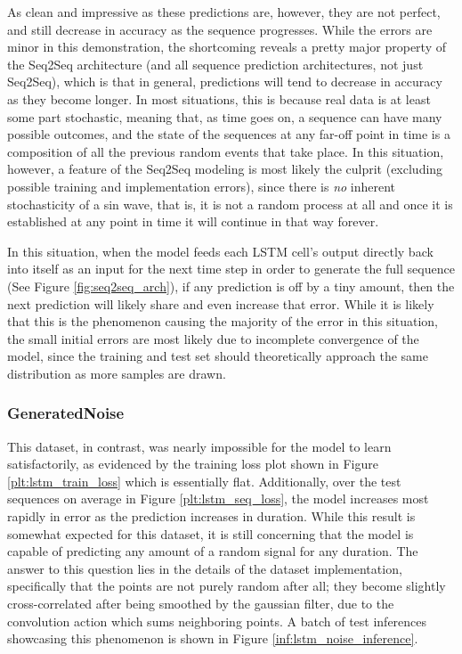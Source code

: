 \documentclass{scrartcl}
\begin{document}
As clean and impressive as these predictions are, however, they are not
perfect, and still decrease in accuracy as the sequence progresses. While the
errors are minor in this demonstration, the shortcoming reveals a pretty major
property of the Seq2Seq architecture (and all sequence prediction
architectures, not just Seq2Seq), which is that in general, predictions will
tend to decrease in accuracy as they become longer. In most situations, this is
because real data is at least some part stochastic, meaning that, as time goes
on, a sequence can have many possible outcomes, and the state of the sequences
at any far-off point in time is a composition of all the previous random events
that take place. In this situation, however, a feature of the Seq2Seq modeling
is most likely the culprit (excluding possible training and implementation
errors), since there is \textit{no} inherent stochasticity of a sin wave, that
is, it is not a random process at all and once it is established at any point
in time it will continue in that way forever. 

In this situation, when the model feeds each LSTM cell's output directly back
into itself as an input for the next time step in order to generate the full
sequence (See Figure \ref{fig:seq2seq_arch}), if any prediction is off by a
tiny amount, then the next prediction will likely share and even increase that
error. While it is likely that this is the phenomenon causing the majority of
the error in this situation, the small initial errors are most likely due to
incomplete convergence of the model, since the training and test set should
theoretically approach the same distribution as more samples are drawn.

\subsubsection{GeneratedNoise}
\label{subsubsec:generated_noise}

This dataset, in contrast, was nearly impossible for the model to learn
satisfactorily, as evidenced by the training loss plot shown in Figure
\ref{plt:lstm_train_loss} which is essentially flat. Additionally, over the
test sequences on average in Figure \ref{plt:lstm_seq_loss}, the model
increases most rapidly in error as the prediction increases in duration. While
this result is somewhat expected for this dataset, it is still concerning that
the model is capable of predicting any amount of a random signal for any
duration. The answer to this question lies in the details of the dataset
implementation, specifically that the points are not purely random after all;
they become slightly cross-correlated after being smoothed by the gaussian
filter, due to the convolution action which sums neighboring points. A batch of
test inferences showcasing this phenomenon is shown in Figure
\ref{inf:lstm_noise_inference}.
\end{document}
